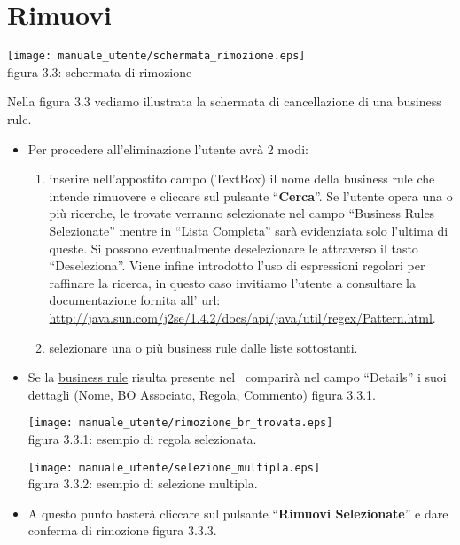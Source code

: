 \section{Rimuovi \br}
\begin{center}
\texttt{[image: manuale\_utente/schermata\_rimozione.eps]}\\
 figura 3.3: schermata di rimozione
\end{center}
Nella figura 3.3 vediamo illustrata la schermata di cancellazione di una business rule.
\begin{itemize}
\item Per procedere all'eliminazione l'utente avr\`a 2 modi:
\begin{enumerate}
\item inserire nell'appostito campo (TextBox) il nome della business rule che intende rimuovere e cliccare sul pulsante ``\textbf{Cerca}''. Se l'utente opera una o pi\`u ricerche, le \br  trovate verranno selezionate nel campo ``Business Rules Selezionate'' mentre in ``Lista Completa'' sar\`a evidenziata solo l'ultima di queste. Si possono eventualmente deselezionare le \br attraverso il tasto ``Deseleziona''. Viene infine introdotto l'uso di espressioni regolari per raffinare la ricerca, in questo caso invitiamo l'utente a consultare la documentazione fornita all' url:\\ \href{http://java.sun.com/j2se/1.4.2/docs/api/java/util/regex/Pattern.html}{http://java.sun.com/j2se/1.4.2/docs/api/java/util/regex/Pattern.html}.
\item selezionare una o pi\`u \underline{business rule} dalle liste sottostanti.
\end{enumerate}

\item Se la \underline{business rule} risulta presente nel \rp\, comparir\`a  nel campo ``Details'' i suoi dettagli (Nome, BO Associato, Regola, Commento) figura 3.3.1. 

\begin{center}
\texttt{[image: manuale\_utente/rimozione\_br\_trovata.eps]}\\
 figura 3.3.1: esempio di regola selezionata.
\end{center} 

\begin{center}
\texttt{[image: manuale\_utente/selezione\_multipla.eps]}\\
 figura 3.3.2: esempio di selezione multipla.
\end{center} 

\item A questo punto baster\`a cliccare sul pulsante ``\textbf{Rimuovi Selezionate}'' e dare conferma di rimozione figura 3.3.3.  
\end{itemize}

